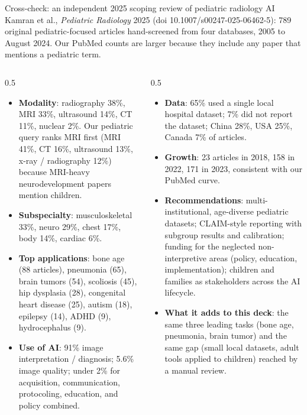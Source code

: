 \documentclass[aspectratio=169]{beamer}
\begin{document}
\begin{frame}[category=Journals/Preprints]{Cross-check: an independent 2025 scoping review of pediatric radiology AI}
\scriptsize
Kamran et al., \textit{Pediatric Radiology} 2025 (doi 10.1007/s00247-025-06462-5): 789 original pediatric-focused
articles hand-screened from four databases, 2005 to August 2024. Our PubMed counts are larger because they include any
paper that mentions a pediatric term.
\begin{columns}[T]
\begin{column}{0.5\textwidth}
\begin{itemize}
  \item \textbf{Modality}: radiography 38\%, MRI 33\%, ultrasound 14\%, CT 11\%, nuclear 2\%. Our pediatric query
        ranks MRI first (MRI 41\%, CT 16\%, ultrasound 13\%, x-ray / radiography 12\%) because MRI-heavy neurodevelopment papers mention children.
  \item \textbf{Subspecialty}: musculoskeletal 33\%, neuro 29\%, chest 17\%, body 14\%, cardiac 6\%.
  \item \textbf{Top applications}: bone age (88 articles), pneumonia (65), brain tumors (54), scoliosis (45),
        hip dysplasia (28), congenital heart disease (25), autism (18), epilepsy (14), ADHD (9), hydrocephalus (9).
  \item \textbf{Use of AI}: 91\% image interpretation / diagnosis; 5.6\% image quality; under 2\% for
        acquisition, communication, protocoling, education, and policy combined.
\end{itemize}
\end{column}
\begin{column}{0.5\textwidth}
\begin{itemize}
  \item \textbf{Data}: 65\% used a single local hospital dataset; 7\% did not report the dataset;
        China 28\%, USA 25\%, Canada 7\% of articles.
  \item \textbf{Growth}: 23 articles in 2018, 158 in 2022, 171 in 2023, consistent with our PubMed curve.
  \item \textbf{Recommendations}: multi-institutional, age-diverse pediatric datasets; CLAIM-style reporting with
        subgroup results and calibration; funding for the neglected non-interpretive areas (policy, education,
        implementation); children and families as stakeholders across the AI lifecycle.
  \item \textbf{What it adds to this deck}: the same three leading tasks (bone age, pneumonia, brain tumor) and the
        same gap (small local datasets, adult tools applied to children) reached by a manual review.
\end{itemize}
\end{column}
\end{columns}
\end{frame}
\end{document}
